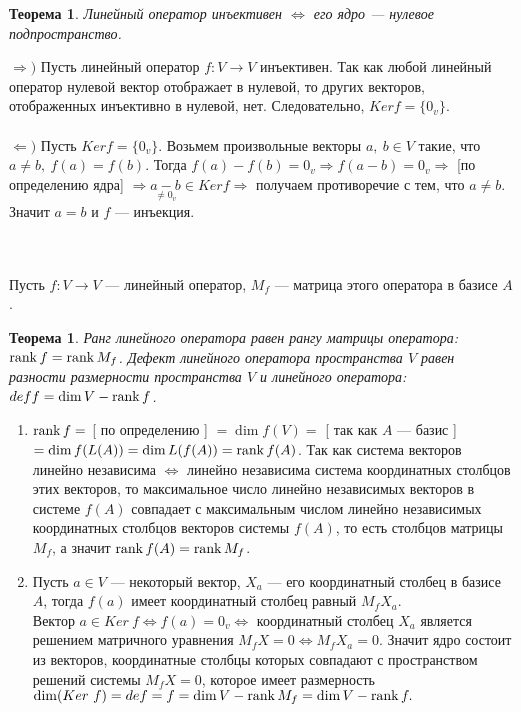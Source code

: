 \newtheorem*{th11_4_1}{Теорема}\begin{th11_4_1}Линейный оператор инъективен $\Longleftrightarrow$ его ядро --- нулевое подпространство.
\end{th11_4_1}\begin{Proof}
	$\Rightarrow)$ Пусть линейный оператор $f:V\rightarrow V$ инъективен. Так как любой линейный оператор нулевой вектор отображает в нулевой, то других векторов, отображенных инъективно в нулевой, нет. Следовательно, $Kerf = \{ 0_v \}$.\\\\
	$\Leftarrow )$ Пусть $Kerf = \{ 0_v \}$. Возьмем произвольные векторы $a,\ b\in V$ такие, что $a\ne b,\ f(a) = f(b).$ Тогда $f(a) - f(b) = 0_v \Rightarrow f(a-b) = 0_v \Rightarrow$ [по определению ядра] $\Rightarrow \underset{\ne 0_v}{a-b} \in Kerf \Rightarrow$ получаем противоречие с тем, что $a\ne b$. Значит $a = b$ и $f$ --- инъекция.
\end{Proof}\\\\
Пусть $f:V\rightarrow V$ --- линейный оператор, $M_f$ --- матрица этого оператора в базисе $A$.
\newtheorem*{th11_4_2}{Теорема}\begin{th11_4_2}Ранг линейного оператора равен рангу матрицы оператора: $\operatorname{rank}  f = \operatorname{rank}  M_f$. Дефект линейного оператора пространства $V$ равен разности размерности пространства $V$ и линейного оператора: $def f = \dim  V - \operatorname{rank}  f$.
\end{th11_4_2}\begin{Proof}\begin{enumerate}
		\item $\operatorname{rank}  f=$ [ по определению ] $=\dim f(V) =$ [ так как $A$ --- базис ] $= \dim f(L(A)) = \dim  L(f(A)) = \operatorname{rank}  f(A)$. Так как система векторов линейно независима $\Longleftrightarrow$ линейно независима система координатных столбцов этих векторов, то максимальное число линейно независимых векторов в системе $f(A)$ совпадает с максимальным числом линейно независимых координатных столбцов векторов системы $f(A)$, то есть столбцов матрицы $M_f$, а значит $\operatorname{rank}  f(A) = \operatorname{rank}  M_f$.
		\item Пусть $a \in V$ --- некоторый вектор, $X_a$ --- его координатный столбец в базисе $A$, тогда $f(a)$ имеет координатный столбец равный $M_f X_a$. \\Вектор $a\in Ker\ f \Longleftrightarrow f(a) = 0_v \Longleftrightarrow$ координатный столбец $X_a$ является решением матричного уравнения $M_f X = 0 \Longleftrightarrow M_fX_a = 0$. Значит ядро состоит из векторов, координатные столбцы которых совпадают с пространством решений системы $M_f X = 0$, которое имеет размерность $\dim (Ker\ f) = def= f = \dim V-\operatorname{rank} M_f = \dim V - \operatorname{rank} f.$
	\end{enumerate}
\end{Proof}
